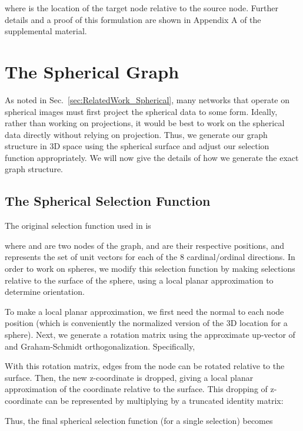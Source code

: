 \documentclass[10pt,twocolumn,letterpaper]{article}
\begin{document}
\noindent where  is the location of the target node relative to the source node. Further details and a proof of this formulation are shown in Appendix A of the supplemental material.

\section{The Spherical Graph}\label{sec:Spheres}

As noted in Sec.~\ref{sec:RelatedWork_Spherical}, many networks that operate on spherical images must first project the spherical data to some form. 
Ideally, rather than working on projections, it would be best to work on the spherical data directly without relying on projection. Thus, we generate our graph structure in 3D space using the spherical surface and adjust our selection function appropriately. We will now give the details of how we generate the exact graph structure.

\subsection{The Spherical Selection Function} \label{sec:SphericalFunction}

The original selection function used in \cite{SelectionConv} is

\noindent where  and  are two nodes of the graph,  and  are their respective positions, and   represents the set of unit vectors for each of the 8 cardinal/ordinal directions. In order to work on spheres, we modify this selection function by making selections relative to the surface of the sphere, using a local planar approximation to determine orientation.

To make a local planar approximation, we first need the normal  to each node position (which is conveniently the normalized version of the 3D location  for a sphere). Next, we generate a rotation matrix using the approximate up-vector of  and Graham-Schmidt orthogonalization. Specifically,



\noindent With this rotation matrix, edges from the node can be rotated relative to the surface. Then, the new z-coordinate is dropped, giving a local planar approximation of the coordinate relative to the surface. This dropping of z-coordinate can be represented by multiplying by a truncated identity matrix:


\noindent Thus, the final spherical selection function (for a single selection) becomes
\end{document}
